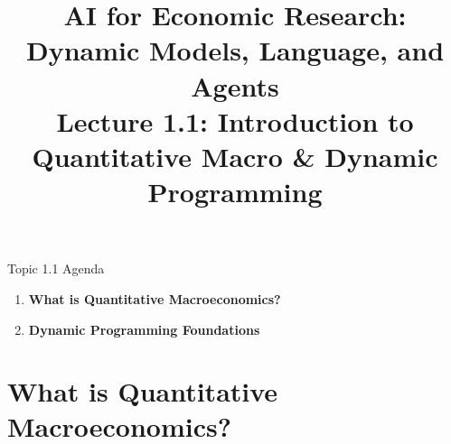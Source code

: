 


\graphicspath{{./pic/}{../../FullCourse_10Lecs/Lec01_Quant_Macro/pic/}{../}}

\title[AI for Econ Research]{AI for Economic Research: Dynamic Models, Language, and Agents\\
Lecture 1.1: Introduction to Quantitative Macro \& Dynamic Programming}



\makebeamertitle

\begin{frame}{Topic 1.1 Agenda}
\begin{enumerate}
  \item \textbf{What is Quantitative Macroeconomics?}
  \medskip
  \item \textbf{Dynamic Programming Foundations}
\end{enumerate}
\end{frame}

\section{What is Quantitative Macroeconomics?}

